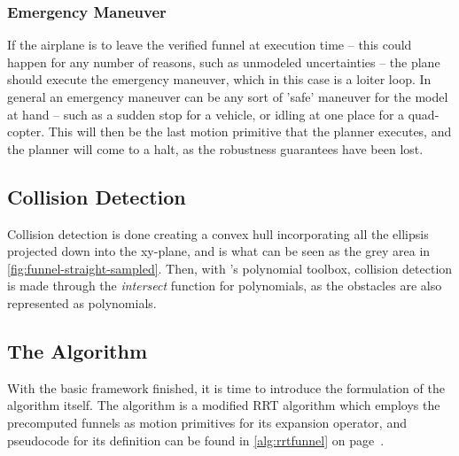 \subsubsection{Emergency Maneuver}

If the airplane is to leave the verified funnel at execution time -- this could
happen for any number of reasons, such as unmodeled uncertainties -- the plane
should execute the emergency maneuver, which in this case is a loiter loop. In
general an emergency maneuver can be any sort of 'safe' maneuver for the model
at hand -- such as a sudden stop for a vehicle, or idling at one place for a
quad-copter. This will then be the last motion primitive that the planner
executes, and the planner will come to a halt, as the robustness guarantees have
been lost.


\subsection{Collision Detection}

Collision detection is done creating a convex hull incorporating all the
ellipsis projected down into the xy-plane, and is what can be seen as the grey
area in \cref{fig:funnel-straight-sampled}. Then, with \matlab's polynomial
toolbox, collision detection is made through the \textit{intersect} function for
polynomials, as the obstacles are also represented as polynomials.


\subsection{The \rrtfunnel{} Algorithm}

With the basic framework finished, it is time to introduce the formulation of
the \rrtfunnel{} algorithm itself. The \rrtfunnel{} algorithm is a modified
\ac{RRT} algorithm which employs the precomputed funnels as motion primitives
for its expansion operator, and pseudocode for its definition can be found in
\cref{alg:rrtfunnel} on page~\pageref{alg:rrtfunnel}.


